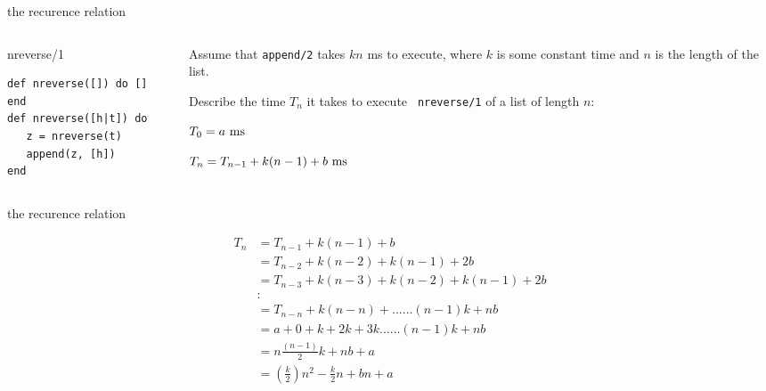 \begin{frame}[fragile]{the recurence relation}

\begin{columns}
   \begin{column}{.4\linewidth}
     \begin{block}{nreverse/1}
       \begin{verbatim}
def nreverse([]) do [] end
def nreverse([h|t]) do 
   z = nreverse(t)
   append(z, [h])
end
       \end{verbatim}
      \end{block}
    \end{column}
\pause
    \begin{column}{.6\linewidth}
      Assume that {\tt append/2} takes $kn$ ms to execute, where $k$
      is some constant time and $n$ is the length of the list. \pause

      \vspace{5pt} Describe the time $T_n$ it takes to execute {\tt
        nreverse/1} of a list of length $n$: \pause

      \vspace{5pt}      
      $T_0 = a {\rm \ ms}$ \pause
      
      $T_n = T_{n-1} + k(n-1) + b {\rm \ ms}$ \pause
    \end{column}
  \end{columns}
  
\end{frame}


\begin{frame}[fragile]{the recurence relation}

\begin{equation}  
  \begin{split}
T_n & = T_{n-1} + k(n-1) + b \\
    & = T_{n-2} + k(n-2) + k(n-1) + 2b \\
    & = T_{n-3} + k(n-3) + k(n-2) + k(n-1) + 2b \\
    & : \\
    & = T_{n-n} + k(n-n) + ...... (n-1)k  + nb \\
    & = a + 0 + k + 2k + 3k ...... (n-1)k  + nb  \\
    & = n\frac{(n-1)}{2}k + nb + a \\
    & = (\frac{k}{2})n^2 - \frac{k}{2}n+ bn + a \\
  \end{split} 
\end{equation}

\end{frame}


